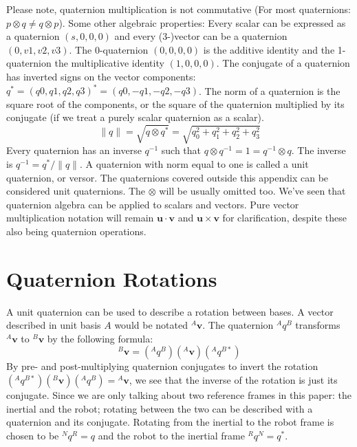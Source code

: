 \documentclass[lettersize,journal]{IEEEtran}
\begin{document}
Please note, quaternion multiplication is not commutative (For most quaternions: $p\otimes q\neq q \otimes p$). Some other algebraic properties:
Every scalar can be expressed as a quaternion $(s, 0, 0, 0)$ and every (3-)vector can be a quaternion $(0, v1, v2, v3)$. The 0-quaternion $(0, 0, 0, 0)$ is the additive identity and the 1-quaternion the multiplicative identity $(1, 0, 0, 0)$. The conjugate of a quaternion has inverted signs on the vector components: $q^*=(q0, q1, q2, q3)^*=(q0, -q1, -q2, -q3)$. The norm of a quaternion is the square root of the components, or the square of the quaternion multiplied by its conjugate (if we treat a purely scalar quaternion as a scalar).
\begin{equation}
  \|q\| = \sqrt{q\otimes q^*} = \sqrt{q_0^2+q_1^2+q_2^2+q_3^2}
\end{equation}
Every quaternion has an inverse $q^{-1}$ such that $q\otimes q^{-1}=1=q^{-1}\otimes q$. The inverse is $q^{-1}=q^*/\|q\|$. A quaternion with norm equal to one is called a unit quaternion, or versor. The quaternions covered outside this appendix can be considered unit quaternions. The $\otimes$ will be usually omitted too. We've seen that quaternion algebra can be applied to scalars and vectors. Pure vector multiplication notation will remain $\mathbf{u}\cdot\mathbf{v}$ and $\mathbf{u}\times\mathbf{v}$ for clarification, despite these also being quaternion operations.

\section*{Quaternion Rotations}
A unit quaternion can be used to describe a rotation between bases. A vector described in unit basis $A$ would be notated $^A\mathbf{v}$. The quaternion $^Aq^B$ transforms $^A\mathbf{v}$ to $^B\mathbf{v}$ by the following formula:
\begin{equation}
  {^B\mathbf{v}} = \left({^Aq^B}\right)\left( {^A\mathbf{v}}\right)\left( {^Aq^{B*}}\right)
\end{equation}
By pre- and post-multiplying quaternion conjugates to invert the rotation $\left({^Aq^{B*}}\right)\left({^B\mathbf{v}}\right)\left({^Aq^B}\right)={^A\mathbf{v}}$, we see that the inverse of the rotation is just its conjugate. Since we are only talking about two reference frames in this paper: the inertial and the robot; rotating between the two can be described with a quaternion and its conjugate. Rotating from the inertial to the robot frame is chosen to be ${^Nq^R}=q$ and the robot to the inertial frame ${^Rq^N}=q^*$.
\end{document}
